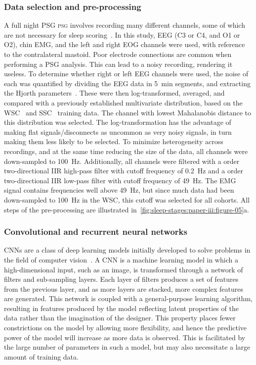 \subsubsection{Data selection and pre-processing}
A full night \ac{PSG} \textsc{psg} involves recording many different channels, some of which are not necessary for sleep scoring~\cite{Silber2007}. 
In this study, \ac{EEG} (C3 or C4, and O1 or O2), chin \ac{EMG}, and the left and right \ac{EOG} channels were used, with reference to the contralateral mastoid. 
Poor electrode connections are common when performing a \ac{PSG} analysis. 
This can lead to a noisy recording, rendering it useless. 
To determine whether right or left \ac{EEG} channels were used, the noise of each was quantified by dividing the \ac{EEG} data in \SI{5}{\minute} segments, and extracting the Hjorth parameters~\cite{Hjorth1970}. 
These were then log-transformed, averaged, and compared with a previously established multivariate distribution, based on the \ac{WSC}~\cite{Young2009,Moore2014} and \ac{SSC}~\cite{Andlauer2013,Moore2014} training data. 
The channel with lowest Mahalanobis distance to this distribution was selected. 
The log-transformation has the advantage of making flat signals/disconnects as uncommon as very noisy signals, in turn making them less likely to be selected. 
To minimize heterogeneity across recordings, and at the same time reducing the size of the data, all channels were down-sampled to \SI{100}{\hertz}. 
Additionally, all channels were filtered with a  order two-directional \ac{IIR} high-pass filter with cutoff frequency of \SI{0.2}{\hertz} and a  order two-directional \ac{IIR} low-pass filter with cutoff frequency of \SI{49}{\hertz}. 
The \ac{EMG} signal contains frequencies well above \SI{49}{\hertz}, but since much data had been down-sampled to \SI{100}{\hertz} in the \ac{WSC}, this cutoff was selected for all cohorts. 
All steps of the pre-processing are illustrated in~\cref{fig:sleep-stages:paper-iii:figure-05}a.

\subsubsection{Convolutional and recurrent neural networks}
\acp{CNN} are a class of deep learning models initially developed to solve problems in the field of computer vision~\cite{LeCun2015}.
A \ac{CNN} is a machine learning model in which a high-dimensional input, such as an image, is transformed through a network of filters and sub-sampling layers.
Each layer of filters produces a set of features from the previous layer, and as more layers are stacked, more complex features are generated. 
This network is coupled with a general-purpose learning algorithm, resulting in features produced by the model reflecting latent properties of the data rather than the imagination of the designer. 
This property places fewer constrictions on the model by allowing more flexibility, and hence the predictive power of the model will increase as more data is observed. 
This is facilitated by the large number of parameters in such a model, but may also necessitate a large amount of training data. 

